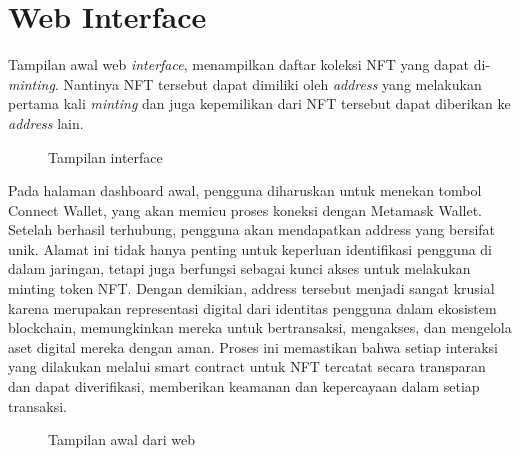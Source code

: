 \section{Web Interface}
Tampilan awal web \emph{interface}, menampilkan daftar koleksi NFT yang dapat di-\emph{minting}. Nantinya NFT tersebut dapat dimiliki oleh \emph{address} yang melakukan pertama kali \emph{minting} dan juga kepemilikan dari NFT tersebut dapat diberikan ke \emph{address} lain.
\begin{figure} [H] \centering
  \caption{Tampilan interface}
  \label{fig:interface}
\end{figure}

Pada halaman dashboard awal, pengguna diharuskan untuk menekan tombol Connect Wallet, yang akan memicu proses koneksi dengan Metamask Wallet. Setelah berhasil terhubung, pengguna akan mendapatkan address yang bersifat unik. Alamat ini tidak hanya penting untuk keperluan identifikasi pengguna di dalam jaringan, tetapi juga berfungsi sebagai kunci akses untuk melakukan minting token NFT. Dengan demikian, address tersebut menjadi sangat krusial karena merupakan representasi digital dari identitas pengguna dalam ekosistem blockchain, memungkinkan mereka untuk bertransaksi, mengakses, dan mengelola aset digital mereka dengan aman. Proses ini memastikan bahwa setiap interaksi yang dilakukan melalui smart contract untuk NFT tercatat secara transparan dan dapat diverifikasi, memberikan keamanan dan kepercayaan dalam setiap transaksi.

  \begin{figure} [H] \centering
  \caption{Tampilan awal dari web}
  \label{fig:homepage}
  \end{figure}

